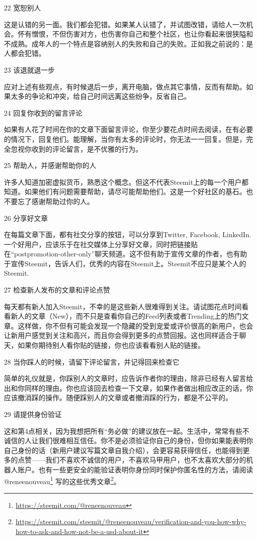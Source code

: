 \documentclass[]{ctexbook}
\renewcommand{\href}[2]{#2\footnote{\url{#1}}}
\begin{document}
22 宽恕别人

这是认错的另一面。我们都会犯错。如果某人认错了，并试图改错，请给人一次机会。怀有憎恨，不但伤害对方，也伤害你自己和整个社区，也让你看起来很狭隘和不成熟。成年人的一个特点是容纳别人的失败和自己的失败。正如我之前说的：是人都会犯错。

23 该退就退一步

应对上述有些观点，有时候退后一步，离开电脑，做点其它事情，反而有帮助。如果太多的争论和冲突，给自己时间远离这些纷争，反省自己。

24 回复你收到的留言评论

如果有人花了时间在你的文章下面留言评论，你至少要花点时间去阅读，在有必要的情况下，回复他们。能理解，当你有太多的评论时，你无法一一回复。但是，完全忽视你收到的评论留言，是不优雅的行为。

25 帮助人，并感谢帮助你的人

许多人知道加密虚拟货币，熟悉这个概念。但这不代表Steemit上的每一个用户都知道。如果他们有问题需要帮助，请尽可能帮助他们。这是一个好社区的基石。也不要忘了感谢帮助过你的人。

26 分享好文章

在每篇文章下面，都有社交分享的按钮，可以分享到Twitter, Facebook, LinkedIn. 一个好用户，应该乐于在社交媒体上分享好文章，同时把链接贴在``postpromotion-other-only''聊天频道。这不但有助于宣传文章的作者，也有助于宣传Steemit，告诉人们，优秀的内容在Steemit上。Steemit不应只是某个人的Steemit.

27 检查新人发布的文章和评论点赞

每天都有新人加入Steemit，不幸的是这些新人很难得到关注。请试图花点时间看看新人的文章（New），而不只是查看你自己的Feed列表或者Trending上的热门文章。这样做，你不但有可能会发现一个隐藏的受到宠爱或评价很高的新用户，也会让新用户感觉到关注和高兴，而且你会得到更多的点赞回报。这也同样适合于聊天，如果你期待别人看你贴的链接，你也应该看看别人贴的链接。

28 当你踩人的时候，请留下评论留言，并记得回来检查它

简单的礼仪就是，你踩别人的文章时，应告诉作者你的理由，除非已经有人留言给出和你同样的理由。你也应该回去检查一下文章，如果作者做出相应改正的话，你应该撤消踩的操作。随便踩别人的文章或者撤消踩的行为，都是不公平的。

29 请提供身份验证

这和第4点相关，因为我想把所有``务必做''的建议放在一起。生活中，常常有些不诚信的人让我们很难相互信任。你不是必须验证你自己的身份，但你如果能表明你自己身份的话（新用户建议写篇文章自我介绍），会更容易获得信任，也能得到更多的点赞------我们不喜欢不诚信的用户，不喜欢马甲用户，也不太喜欢大部分的机器人账户。也有一些更安全的能验证表明你身份同时保护你匿名性的方法，请阅读 \href{https://steemit.com/@reneenouveau}{@reneenouveau} 写的\href{https://steemit.com/steemit/@reneenouveau/verification-and-you-how-why-how-to-ask-and-how-not-be-a-usd-about-it}{这些优秀文章}。
\end{document}
